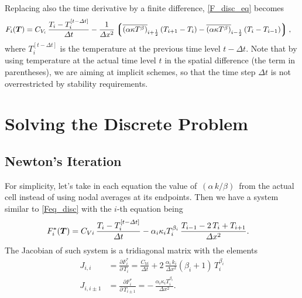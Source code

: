 \documentclass[12pt]{article}
\newcommand{\dx}{\Delta x}
\newcommand{\dt}{\Delta t}
\newcommand{\oh}{\frac{1}{2}}
\newcommand{\imh}{i-\oh}
\newcommand{\iph}{i+\oh}
\def\cond{\kappa}
\begin{document}
Replacing also the time derivative by a finite difference,
\eqref{F_disc_eq} becomes
\begin{align}\label{eq:Fprecise}
  F_i(\vectorsym{T}) &= C_{V_i}\,\frac{T_i-T_i^{[t-\dt]}}{\dt}
  - \frac{1}{\dx^2}\left\lgroup
          {\textstyle{\overline{\left(\alpha\cond T^\beta\right)}}}_{\iph}
          \left(T_{i+1}-T_{i}\right)
        - {\textstyle{\overline{\left(\alpha\cond T^\beta\right)}}}_{\imh}
          \left(T_{i}-T_{i-1}\right)
    \right\rgroup,
\end{align}
where $T_i^{[t-\dt]}$ is the temperature at the previous time level $t-\dt$.
Note that by using temperature at the actual time level $t$
in the spatial difference (the term in parentheses),
we are aiming at implicit schemes, so that the time step $\dt$ is not
overrestricted by stability requirements.


\section{Solving the Discrete Problem}
\subsection{Newton's Iteration}

For simplicity, let's take in each equation the value of \,$(\alpha\,k/\beta)$\,
from the actual cell instead of using nodal averages at its endpoints.
Then we have a system similar
to \eqref{Feq_disc} with the $i$-th equation being
\begin{align}\label{F_disc_eq_cellb}
  F^*_i(\vectorsym{T})&= C_{Vi}\,\frac{T_i-T_i^{[t-\dt]}}{\dt}
  - \alpha_i \cond_i T_i^{\beta_i} \,
          \frac{T_{i-1} - 2\,T_{i} + T_{i+1}}{\dx^2}.
\end{align}
The Jacobian of such system is a tridiagonal matrix with the elements
\begin{subequations}\label{dF_disc_eq_cellb}
  \begin{align}
    J_{i,i}
    &= \frac{\partial F^*_i}{\partial\,T_i}
    =  \frac{C_{Vi}}{\dt}    
        + 2\,\frac{\alpha_i\,k_i}{\dx^2}(\beta_i+1)\,T_{i}^{\beta_i}
    \\
    J_{i,i\pm 1}
    &= \frac{\partial F^*_i}{\partial\,T_{i\pm 1}}
    = -\,\frac{\alpha_i \cond_i T_i^{\beta_i}}{\dx^2}.
\end{align}
\end{subequations}
\end{document}
